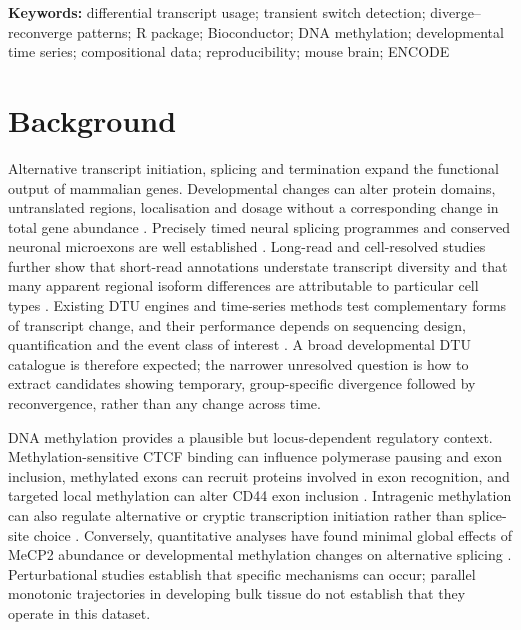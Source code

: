 \documentclass[11pt,a4paper]{article}
\begin{document}
\textbf{Keywords:} differential transcript usage; transient switch detection; diverge--reconverge patterns; R package; Bioconductor; DNA methylation; developmental time series; compositional data; reproducibility; mouse brain; ENCODE

\section{Background}

Alternative transcript initiation, splicing and termination expand the functional output of mammalian genes. Developmental changes can alter protein domains, untranslated regions, localisation and dosage without a corresponding change in total gene abundance \citep{kalsotra_functional_2011,baralle_alternative_2017}. Precisely timed neural splicing programmes and conserved neuronal microexons are well established \citep{weyn2018temporal,irimia_neuronal_microexons_2014}. Long-read and cell-resolved studies further show that short-read annotations understate transcript diversity and that many apparent regional isoform differences are attributable to particular cell types \citep{leung_cortex_isoforms_2021,joglekar_isoform_atlas_2021,alieh_cortical_isoforms_2024,joglekar_single_cell_long_read_2024}. Existing DTU engines and time-series methods test complementary forms of transcript change, and their performance depends on sequencing design, quantification and the event class of interest \citep{soneson_dtu_2016,lio_dtu_benchmark_2025}. A broad developmental DTU catalogue is therefore expected; the narrower unresolved question is how to extract candidates showing temporary, group-specific divergence followed by reconvergence, rather than any change across time.

DNA methylation provides a plausible but locus-dependent regulatory context. Methylation-sensitive CTCF binding can influence polymerase pausing and exon inclusion, methylated exons can recruit proteins involved in exon recognition, and targeted local methylation can alter CD44 exon inclusion \citep{shukla2011ctcf,maunakea2013mecp2,batsche2021cd44}. Intragenic methylation can also regulate alternative or cryptic transcription initiation rather than splice-site choice \citep{maunakea_promoters_2010,neri_spurious_2017}. Conversely, quantitative analyses have found minimal global effects of MeCP2 abundance or developmental methylation changes on alternative splicing \citep{chhatbar_mecp2_2020}. Perturbational studies establish that specific mechanisms can occur; parallel monotonic trajectories in developing bulk tissue do not establish that they operate in this dataset.
\end{document}
